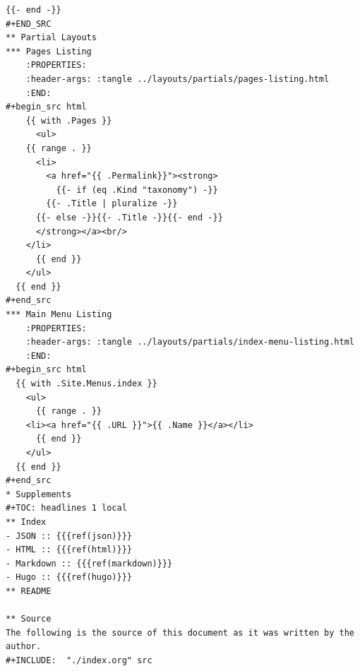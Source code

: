 \documentclass[11pt]{article}
\begin{document}
\begin{verbatim}
{{- end -}}
#+END_SRC
** Partial Layouts
*** Pages Listing
    :PROPERTIES:
    :header-args: :tangle ../layouts/partials/pages-listing.html
    :END:
#+begin_src html
    {{ with .Pages }}
      <ul>
	{{ range . }}
	  <li>
	    <a href="{{ .Permalink}}"><strong>
	      {{- if (eq .Kind "taxonomy") -}}
		{{- .Title | pluralize -}}
	  {{- else -}}{{- .Title -}}{{- end -}}
	  </strong></a><br/>
	</li>
      {{ end }}
    </ul>
  {{ end }}
#+end_src
*** Main Menu Listing
    :PROPERTIES:
    :header-args: :tangle ../layouts/partials/index-menu-listing.html
    :END:
#+begin_src html
  {{ with .Site.Menus.index }}
    <ul>
      {{ range . }}
	<li><a href="{{ .URL }}">{{ .Name }}</a></li>
      {{ end }}
    </ul>
  {{ end }}
#+end_src
* Supplements
#+TOC: headlines 1 local
** Index
- JSON :: {{{ref(json)}}}
- HTML :: {{{ref(html)}}}
- Markdown :: {{{ref(markdown)}}}
- Hugo :: {{{ref(hugo)}}}
** README

** Source
The following is the source of this document as it was written by the
author.
#+INCLUDE:  "./index.org" src
\end{verbatim}
\stopcontents[level-1]
\end{document}
